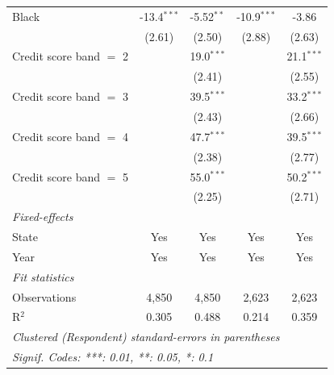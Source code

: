 \begin{tabular}{lcccc}
   Black                          & -13.4$^{***}$ & -5.52$^{**}$  & -10.9$^{***}$ & -3.86\\   
                                  & (2.61)        & (2.50)        & (2.88)        & (2.63)\\   
   Credit score band $=$ 2        &               & 19.0$^{***}$  &               & 21.1$^{***}$\\   
                                  &               & (2.41)        &               & (2.55)\\   
   Credit score band $=$ 3        &               & 39.5$^{***}$  &               & 33.2$^{***}$\\   
                                  &               & (2.43)        &               & (2.66)\\   
   Credit score band $=$ 4        &               & 47.7$^{***}$  &               & 39.5$^{***}$\\   
                                  &               & (2.38)        &               & (2.77)\\   
   Credit score band $=$ 5        &               & 55.0$^{***}$  &               & 50.2$^{***}$\\   
                                  &               & (2.25)        &               & (2.71)\\   
   \midrule
   \emph{Fixed-effects}\\
   State                          & Yes           & Yes           & Yes           & Yes\\  
   Year                           & Yes           & Yes           & Yes           & Yes\\  
   \midrule
   \emph{Fit statistics}\\
   Observations                   & 4,850         & 4,850         & 2,623         & 2,623\\  
   R$^2$                          & 0.305         & 0.488         & 0.214         & 0.359\\  
   \midrule \midrule
   \multicolumn{5}{l}{\emph{Clustered (Respondent) standard-errors in parentheses}}\\
   \multicolumn{5}{l}{\emph{Signif. Codes: ***: 0.01, **: 0.05, *: 0.1}}\\
\end{tabular}
\par\endgroup


